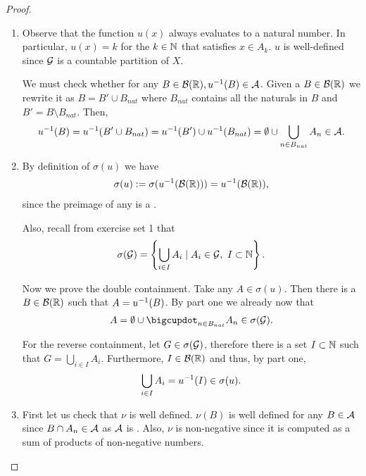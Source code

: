 \begin{proof}$ $\newline
	\begin{enumerate}
		\item Observe that the function $u(x)$ always evaluates to a natural number. In particular, $u(x) = k$ for the $k \in \mathbb{N}$ that satisfies $x \in A_k$. $u$ is well-defined since $\mathcal{G}$ is a countable partition of $X$.
		
		We must check whether for any $B \in \mathcal{B}(\mathbb{R}), {u}^{-1}(B) \in \mathcal{A}$. Given a $B \in \mathcal{B}(\mathbb{R})$ we rewrite it as $B = B' \cup B_{nat}$ where $B_{nat}$ contains all the naturals in $B$ and $B' = B \setminus B_{nat}$. Then,
		\begin{align*}
		{u}^{-1}(B) = {u}^{-1}(B' \cup B_{nat}) = {u}^{-1}(B') \cup {u}^{-1}(B_{nat}) = \emptyset \cup \bigcup_{n \in B_{nat}} A_n \in \mathcal{A}.
		\end{align*}
		
		\item By definition of $\sigma(u)$ we have
		\begin{align*}
		\sigma(u) := \sigma ({u}^{-1}(\mathcal{B}(\mathbb{R}))) = {u}^{-1}(\mathcal{B}(\mathbb{R})),
		\end{align*}
		since the preimage of any \siga is a \siga.
		
		Also, recall from exercise set 1 that
		\begin{align*}
		\sigma(\mathcal{G}) = \left\{ \bigcup_{i \in I} A_i \mid A_i \in \mathcal{G},\ I \subset \mathbb{N} \right\}.
		\end{align*}
		
		Now we prove the double containment. Take any $A \in \sigma(u)$. Then there is a $B \in \mathcal{B}(\mathbb{R})$ such that $A = {u}^{-1}(B)$. By part one we already now that
		\begin{align*}
		A = \emptyset \cup \bigcupdot_{n \in B_{nat}} A_n \in \sigma(\calG).
		\end{align*}
		
		For the reverse containment, let $G \in \sigma(\mathcal{G})$, therefore there is a set $I \subset \mathbb{N}$ such that $G = \bigcup_{i \in I} A_i$. Furthermore, $I \in \mathcal{B}(\mathbb{R})$ and thus, by part one,
		\begin{align*}
		\bigcup_{i \in I} A_i = {u}^{-1}(I) \in \sigma(u).
		\end{align*}
		
		\item First let us check that $\nu$ is well defined. $\nu(B)$ is well defined for any $B \in \mathcal{A}$ since $B \cap A_n \in \mathcal{A}$ as $\mathcal{A}$ is \istable. Also, $\nu$ is non-negative since it is computed as a sum of products of non-negative numbers.
		

\end{enumerate}
\end{proof}
